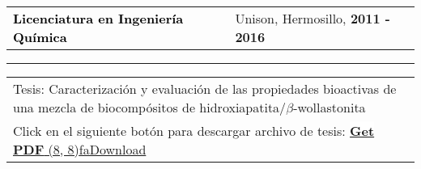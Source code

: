 \documentclass[10pt,A4]{article}
\newcommand{\mpwidth}{\linewidth-\fboxsep-\fboxsep}
\newcommand{\tzlarrow}{(0,0) -- (0.2,0) -- (0.3,0.2) -- (0.2,0.4) -- (0,0.4) -- (0.1,0.2) -- cycle;}
\newcommand{\larrow}[1]
{\begin{tikzpicture}[scale=0.58]
	 \filldraw[fill=#1!100,draw=#1!100!black]  \tzlarrow
 \end{tikzpicture}
}
\newcommand{\cvevent}[5]
{
\vspace{8pt}
	\begin{tabular*}{1\mpwidth}{p{0.55\mpwidth}  x{0.42\mpwidth}}
 	\textcolor{black}{\textbf{#2}} & \textcolor{softcol}{#3}, \textcolor{bgcol}{\textbf{#1}}

	\end{tabular*}
\vspace{-12pt}
\textcolor{softcol}{\hrule}
\vspace{6pt}
	\begin{tabular*}{0.5\mpwidth}{p{\mpwidth}}
\larrow{softcol}  #4\\[3pt]
\larrow{softcol}  #5\\[6pt]
	\end{tabular*}

}
\newcommand{\icon}[3]{\makebox(#2, #2){\textcolor{#3}{\csname fa#1\endcsname}}}	%
\begin{document}
{\begin{minipage}[c][0.96\textheight][t]{0.7\linewidth}
%
\cvevent{2011 - 2016}{Licenciatura en Ingenier\'ia Qu\'imica}{Unison, Hermosillo}{
	Tesis: Caracterizaci\'on y evaluaci\'on de las propiedades bioactivas de una mezcla de biocomp\'ositos de hidroxiapatita/$\beta$-wollastonita
}
{
	Click en el siguiente bot\'on para descargar archivo de tesis: \hspace{10.5mm} \href{https://raw.githubusercontent.com/alanmatzumiya/alanmatzumiya.github.io/main/assets/portfolio/bachelor/thesis.pdf}{\colorbox{bgcol}{\colorbox{white}{\textcolor{bgcol}{\hspace{3mm}\textbf{Get PDF}} \hspace{1.5mm} \icon{Download}{8}{bgcol}\hspace{3mm}}}}
}


\end{minipage}}%
\end{document}
